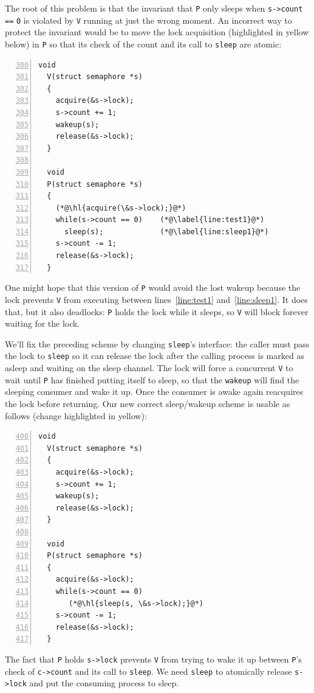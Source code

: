 The root of this problem is that the
invariant that
\lstinline{P}
only sleeps when
\lstinline{s->count}
\lstinline{==}
\lstinline{0}
is violated by 
\lstinline{V}
running at just the wrong moment.
An incorrect way to protect the invariant would be to 
move the lock acquisition (highlighted in yellow below) in
\lstinline{P}
so that its check of the count and its call to \lstinline{sleep}
are atomic:
\begin{lstlisting}[numbers=left,firstnumber=300]
  void
  V(struct semaphore *s)
  {
    acquire(&s->lock);
    s->count += 1;
    wakeup(s);
    release(&s->lock);
  }
  
  void
  P(struct semaphore *s)
  {
    (*@\hl{acquire(\&s->lock);}@*)
    while(s->count == 0)    (*@\label{line:test1}@*)
      sleep(s);             (*@\label{line:sleep1}@*)
    s->count -= 1;
    release(&s->lock);
  }
\end{lstlisting}
One might hope that this version of
\lstinline{P}
would avoid the lost wakeup because the lock prevents
\lstinline{V}
from executing between lines~\ref{line:test1} and~\ref{line:sleep1}.
It does that, but it also deadlocks:
\lstinline{P}
holds the lock while it sleeps,
so \lstinline{V} will block forever waiting for the lock.

We'll fix the preceding scheme by changing
\lstinline{sleep}'s
interface:
the caller must pass the lock to
\lstinline{sleep}
so it can release the lock after
the calling process is marked as asleep and waiting on the
sleep channel.
The lock will force a concurrent
\lstinline{V}
to wait until \lstinline{P} has finished putting itself to sleep,
so that the
\lstinline{wakeup}
will find the sleeping consumer and wake it up.
Once the consumer is awake again
reacquires the lock before returning.
Our new correct sleep/wakeup scheme is usable as follows (change
highlighted in yellow):
\begin{lstlisting}[numbers=left,firstnumber=400]
  void
  V(struct semaphore *s)
  {
    acquire(&s->lock);
    s->count += 1;
    wakeup(s);
    release(&s->lock);
  }

  void
  P(struct semaphore *s)
  {
    acquire(&s->lock);
    while(s->count == 0)
       (*@\hl{sleep(s, \&s->lock);}@*)
    s->count -= 1;
    release(&s->lock);
  }
\end{lstlisting}

The fact that
\lstinline{P}
holds
\lstinline{s->lock}
prevents 
\lstinline{V}
from trying to wake it up between 
\lstinline{P}'s
check of
\lstinline{c->count}
and its call to
\lstinline{sleep}.
We need
\lstinline{sleep}
to atomically release
\lstinline{s->lock}
and put the consuming process to sleep.


